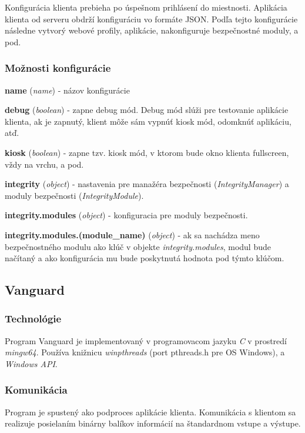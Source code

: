 \documentclass{article}
\newcommand{\filedesc}[1]{\vspace{0.3cm} \noindent \textbf{#1}}
\begin{document}
Konfigurácia klienta prebieha po úspešnom prihlásení do miestnosti. Aplikácia klienta od serveru obdrží konfiguráciu vo formáte JSON. Podľa tejto konfigurácie následne vytvorý webové profily, aplikácie, nakonfiguruje bezpečnostné moduly, a pod.

\subsubsection*{Možnosti konfigurácie}

\filedesc{name} (\emph{name}) - názov konfigurácie

\filedesc{debug} (\emph{boolean}) - zapne debug mód. Debug mód slúži pre testovanie aplikácie klienta, ak je zapnutý, klient môže sám vypnúť kiosk mód, odomknúť aplikáciu, atď.

\filedesc{kiosk} (\emph{boolean}) - zapne tzv. kiosk mód, v ktorom bude okno klienta fullscreen, vždy na vrchu, a pod.

\filedesc{integrity} (\emph{object}) - nastavenia pre manažéra bezpečnosti (\emph{IntegrityManager}) a moduly bezpečnosti (\emph{IntegrityModule}).

\filedesc{integrity.modules} (\emph{object}) - konfiguracia pre moduly bezpečnosti.

\filedesc{integrity.modules.(module\_name)} (\emph{object}) - ak sa nachádza meno bezpečnostného modulu ako klúč v objekte \emph{integrity.modules}, modul bude načítaný a ako konfigurácia mu bude poskytnutá hodnota pod týmto klúčom.

\subsection{Vanguard}

\subsubsection{Technológie}

Program Vanguard je implementovaný v programovacom jazyku \emph{C} v prostredí \emph{mingw64}. Používa knižnicu \emph{winpthreads} (port pthreads.h pre OS Windows), a \emph{Windows API}.

\subsubsection{Komunikácia}

Program je spustený ako podproces aplikácie klienta. Komunikácia s klientom sa realizuje posielaním binárny balíkov informácií na štandardnom vstupe a výstupe.
\end{document}
